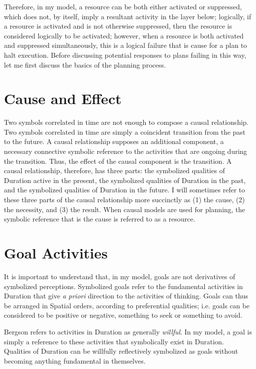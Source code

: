 Therefore, in my model, a resource can be both either activated or
suppressed, which does not, by itself, imply a resultant activity in
the layer below; logically, if a resource is activated and is not
otherwise suppressed, then the resource is considered logically to be
activated; however, when a resource is both activated and suppressed
simultaneously, this is a logical failure that is cause for a plan to
halt execution.  Before discussing potential responses to plans
failing in this way, let me first discuss the basics of the planning
process.

\section{Cause and Effect}

Two symbols correlated in time are not enough to compose a causal
relationship.  Two symbols correlated in time are simply a coincident
transition from the past to the future.  A causal relationship
supposes an additional component, a necessary connective symbolic
reference to the activities that are ongoing during the transition.
Thus, the effect of the causal component is the transition.  A causal
relationship, therefore, has three parts: the symbolized qualities of
Duration active in the present, the symbolized qualities of Duration
in the past, and the symbolized qualities of Duration in the future.
I will sometimes refer to these three parts of the causal relationship
more succinctly as (1) the cause, (2) the necessity, and (3) the
result.  When causal models are used for planning, the symbolic
reference that is the cause is referred to as a resource.

\section{Goal Activities}

It is important to understand that, in my model, goals are not
derivatives of symbolized perceptions.  Symbolized goals refer to the
fundamental activities in Duration that give \emph{a priori} direction
to the activities of thinking.  Goals can thus be arranged in Spatial
orders, according to preferential qualities; i.e. goals can be
considered to be positive or negative, something to seek or something
to avoid.

Bergson refers to activities in Duration as generally \emph{willful}.
In my model, a goal is simply a reference to these activities that
symbolically exist in Duration.  Qualities of Duration can be
willfully reflectively symbolized as goals without becoming anything
fundamental in themselves.

